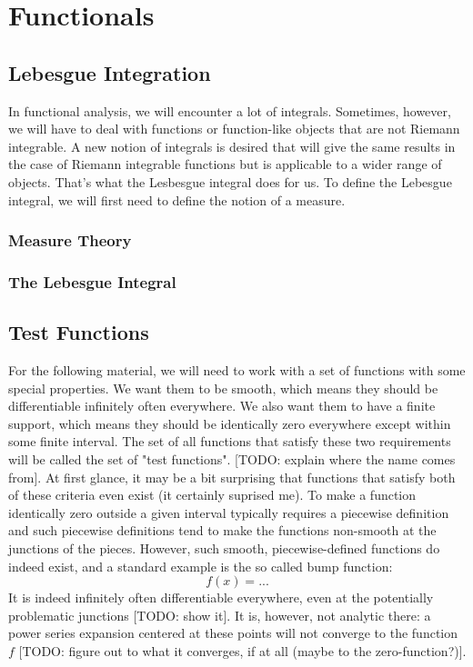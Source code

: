 \section{Functionals} 

\subsection{Lebesgue Integration}
In functional analysis, we will encounter a lot of integrals. Sometimes, however, we will have to deal with functions or function-like objects that are not Riemann integrable. A new notion of integrals is desired that will give the same results in the case of Riemann integrable functions but is applicable to a wider range of objects. That's what the Lesbesgue integral does for us. To define the Lebesgue integral, we will first need to define the notion of a measure.

\subsubsection{Measure Theory}

\subsubsection{The Lebesgue Integral}


\subsection{Test Functions}
For the following material, we will need to work with a set of functions with some special properties. We want them to be smooth, which means they should be differentiable infinitely often everywhere. We also want them to have a finite support, which means they should be identically zero everywhere except within some finite interval. The set of all functions that satisfy these two requirements will be called the set of "test functions". [TODO: explain where the name comes from]. At first glance, it may be a bit surprising that functions that satisfy both of these criteria even exist (it certainly suprised me). To make a function identically zero outside a given interval typically requires a piecewise definition and such piecewise definitions tend to make the functions non-smooth at the junctions of the pieces. However, such smooth, piecewise-defined functions do indeed exist, and a standard example is the so called bump function:
\begin{equation}
 f(x) = ...
\end{equation}
It is indeed infinitely often differentiable everywhere, even at the potentially problematic junctions [TODO: show it]. It is, however, not analytic there: a power series expansion centered at these points will not converge to the function $f$ [TODO: figure out to what it converges, if at all (maybe to the zero-function?)].

